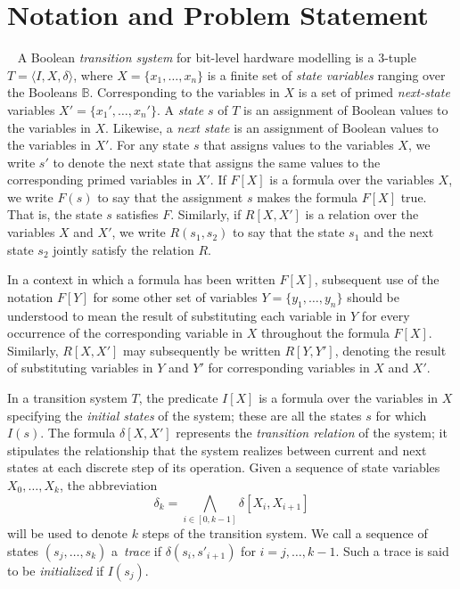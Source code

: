 \section{Notation and Problem Statement}~\label{sec:notation}
%
A Boolean \textit{transition system} for bit-level hardware
modelling is a 3-tuple $T = \langle I,X,\delta \rangle$, where $X = \{x_1,\dots ,x_n\}$
is a finite set of \textit{state variables} ranging over the Booleans $\mathbb{B}$. 
Corresponding to the variables in $X$ is a set of primed \textit{next-state} variables  $X' = \{x_1', \dots, x_n'\}$.
A \textit{state} $s$ of $T$ is an assignment of Boolean values to the variables in $X$. Likewise, a \textit{next state} is an assignment of Boolean values to the variables in $X'$.  For any state $s$ that assigns values to the  variables $X$, we write $s'$ to denote the next state that assigns the same values to the corresponding primed variables in $X'$. If $F[X]$ is a formula over the variables $X$, we write $F(s)$ to say that
the assignment $s$ makes the formula $F[X]$ true. That is, the state $s$ satisfies $F$. Similarly, if $R[X,X']$ is a relation over the variables $X$ and $X'$, we write $R(s_1,s_2)$ to say that the state $s_1$ and the next state $s_2$ jointly satisfy the relation $R$.

In a context in which a formula has been written $F[X]$, subsequent use of the notation $F[Y]$ for
some other set of variables $Y = \{y_1, \dots, y_n\}$ should be understood to mean the
result of substituting each variable in $Y$ for every occurrence of the corresponding variable in $X$ throughout the formula $F[X]$. Similarly, $R[X,X']$ may subsequently be written $R[Y,Y']$, denoting the result of substituting variables in $Y$ and $Y'$ for corresponding variables in $X$ and $X'$.

In a transition system $T$, the predicate $I[X]$ is a formula over the variables in 
$X$ specifying the \textit{initial states} of the system; these are all the states 
$s$ for which $I(s)$. The formula $\delta[X,X']$ represents the \textit{transition relation} of the system; it stipulates the relationship that the system
realizes between current and next states at each discrete step of its operation.
Given a sequence of state variables $X_0, \dots, X_k$, the abbreviation \[ \delta_k = \underset{i \in [0,k-1]}{\bigwedge} \delta[X_i, X_{i+1}]\] 
will be used to denote $k$ steps of the transition system.
We call a sequence of states $(s_j,\dots,s_k)$ a~\textit{trace}
if $\delta(s_i,s'_{i{+}1})$ for $i=j,\dots,k-1$.  Such a trace is
said to be \textit{initialized} if $I(s_j)$.
  
